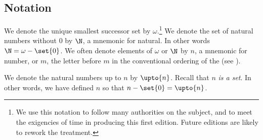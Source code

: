 \subsection*{Notation}


%    

We denote the unique smallest successor set by $\omega $.\footnote{We use this notation to follow many authorities on the subject, and to meet the exigencies of time in producing this first edition.
Future editions are likely to rework the treatment.}
We denote the set of natural numbers without 0 by $\N  $, a mnemonic for natural.
In other words $\N   = \omega  - \set{0}$.
We often denote elements of $\omega $ or $\N  $ by $n$, a mnemonic for number, or $m$, the letter before $m$ in the conventional ordering of the (see ).

We denote the natural numbers up to $n$ by $\upto{n}$.
Recall that $n$ \textit{is a set}.
In other words, we have defined $n$ so that $n - \set{0} = \upto{n}$.

